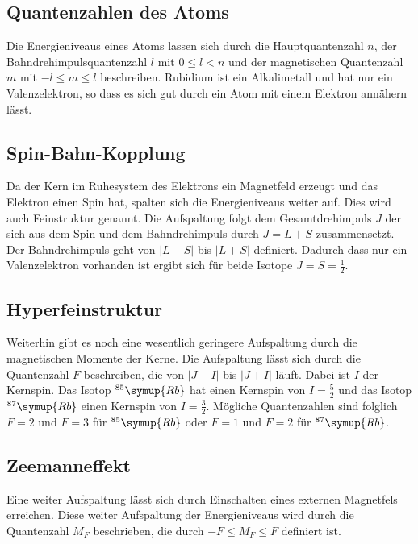 \subsection{Quantenzahlen des Atoms}
\label{sec:Quantenzahlen}
Die Energieniveaus eines Atoms lassen sich durch die Hauptquantenzahl $n$, der Bahndrehimpulsquantenzahl $l$
mit $0 \leq l < n$ und der magnetischen Quantenzahl $m$ mit $-l \leq m \leq l$ beschreiben. Rubidium ist ein
Alkalimetall und hat nur ein Valenzelektron, so dass es sich gut durch ein Atom mit einem Elektron annähern lässt.

\subsection{Spin-Bahn-Kopplung}
\label{sec:Spin-Bahn-Kopplung}
Da der Kern im Ruhesystem des Elektrons ein Magnetfeld erzeugt und das Elektron einen Spin hat, spalten sich die
Energieniveaus weiter auf. Dies wird auch Feinstruktur genannt. Die Aufspaltung folgt dem Gesamtdrehimpuls $J$
der sich aus dem Spin und dem Bahndrehimpuls durch $J=L+S$ zusammensetzt. Der Bahndrehimpuls geht von $|L-S|$ bis
$|L+S|$ definiert. Dadurch dass nur ein Valenzelektron vorhanden ist ergibt sich für beide Isotope
$J=S=\frac{1}{2}$.

\subsection{Hyperfeinstruktur}
\label{sec:Hyperfeinstruktur}
Weiterhin gibt es noch eine wesentlich geringere Aufspaltung durch die magnetischen Momente der Kerne. Die
Aufspaltung lässt sich durch die Quantenzahl $F$ beschreiben, die von $|J-I|$ bis $|J+I|$ läuft. Dabei ist
$I$ der Kernspin. Das Isotop $^{85}\symup{Rb}$ hat einen Kernspin von $I=\frac{5}{2}$ und das Isotop
$^{87}\symup{Rb}$ einen Kernspin von $I=\frac{3}{2}$. Mögliche Quantenzahlen sind folglich $F=2$ und $F=3$
für $^{85}\symup{Rb}$ oder $F=1$ und $F=2$ für $^{87}\symup{Rb}$.

\subsection{Zeemanneffekt}
\label{sec:Zeemanneffekt}
Eine weiter Aufspaltung lässt sich durch Einschalten eines externen Magnetfels erreichen. Diese weiter Aufspaltung
der Energieniveaus wird durch die Quantenzahl $M_F$ beschrieben, die durch $-F \leq M_F \leq F$ definiert ist.